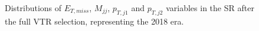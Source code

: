\begin{figure}[htbp]
{    }
  \caption{Distributions of $E_{T,miss}$, $M_{jj}$, $p_{T,j1}$ and $p_{T,j2}$ variables in the SR after the full VTR selection, representing the 2018 era.}
  \label{fig:2018_VTR_SR_motivation_2}
\end{figure}


